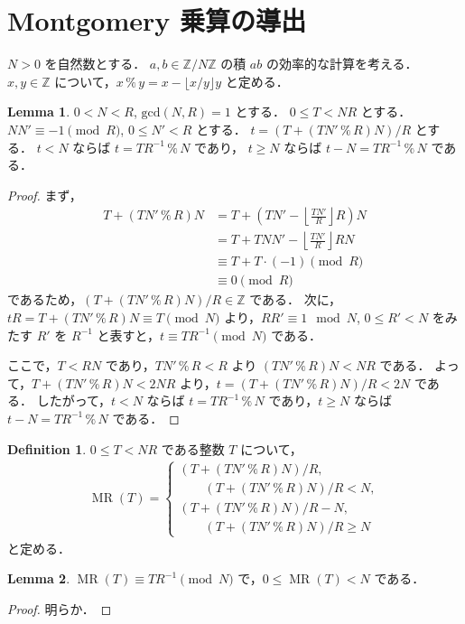 \documentclass[twocolumn, uplatex, dvipdfmx]{jsarticle}
\renewcommand{\ge}{\geqslant}
\renewcommand{\le}{\leqslant}
\numberwithin{equation}{section}
\theoremstyle{definition}
\newtheorem{lem}{Lemma}[section]
\newtheorem{dfn}{Definition}[section]
\newcommand{\Mod}{\,\texttt{\%}\,}
\DeclareMathOperator{\MR}{\mathrm{MR}}
\begin{document}
\section{Montgomery 乗算の導出}

$N>0$ を自然数とする．
$a,b\in\mathbb{Z}/N\mathbb{Z}$ の積 $ab$ の効率的な計算を考える．
$x,y\in\mathbb{Z}$ について，$x\Mod y=x-\lfloor x/y\rfloor y$ と定める．

\begin{lem}
	$0<N<R$, $\mathrm{gcd}(N,R)=1$ とする．
	$0\le T<NR$ とする．
	$NN'\equiv-1\pmod{R}$, $0\le N'<R$ とする．
	$t=(T+(TN'\Mod R)N)/R$ とする．
	$t<N$ ならば $t=TR^{-1}\Mod N$ であり，
	$t\ge N$ ならば $t-N=TR^{-1}\Mod N$ である．
\end{lem}
\begin{proof}
	まず，
	\begin{align*}
		T+(TN'\Mod R)N&=T+\left(TN'-\left\lfloor\frac{TN'}{R}\right\rfloor R\right)N\\
		&=T+TNN'-\left\lfloor\frac{TN'}{R}\right\rfloor RN\\
		&\equiv T+T\cdot(-1)\pmod{R}\\
		&\equiv0\pmod{R}
	\end{align*}
	であるため，$(T+(TN'\Mod R)N)/R\in\mathbb{Z}$ である．
	次に，$tR=T+(TN'\Mod R)N\equiv T\pmod{N}$ より，$RR'\equiv1\mod{N}$, $0\le R'<N$ をみたす $R'$ を $R^{-1}$ と表すと，$t\equiv TR^{-1}\pmod{N}$ である．

	ここで，$T<RN$ であり，$TN'\Mod R<R$ より $(TN'\Mod R)N<NR$ である．
	よって，$T+(TN'\Mod R)N<2NR$ より，$t=(T+(TN'\Mod R)N)/R<2N$ である．
	したがって，$t<N$ ならば $t=TR^{-1}\Mod N$ であり，$t\ge N$ ならば $t-N=TR^{-1}\Mod N$ である．
\end{proof}

\begin{dfn}
	$0\le T<NR$ である整数 $T$ について，
	\begin{align*}
		\MR(T)=\begin{cases}
			(T+(TN'\Mod R)N)/R,\\
			\qquad (T+(TN'\Mod R)N)/R<N,\\
			(T+(TN'\Mod R)N)/R-N,\\
			\qquad (T+(TN'\Mod R)N)/R\ge N
		\end{cases}
	\end{align*}
	と定める．
\end{dfn}

\begin{lem}
	$\MR(T)\equiv TR^{-1}\pmod{N}$ で，$0\le \MR(T)<N$ である．
\end{lem}
\begin{proof}
	明らか．
\end{proof}
\end{document}
